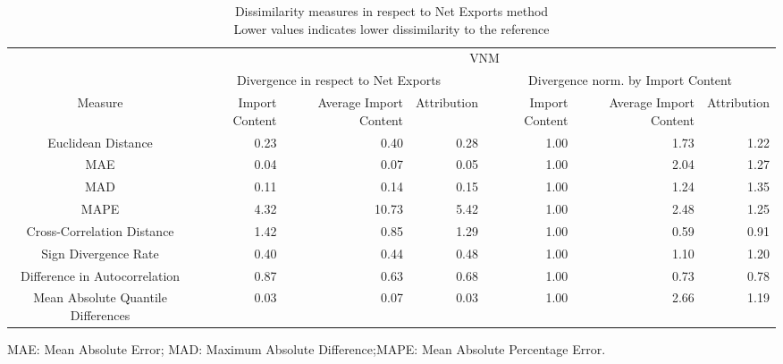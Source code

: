 \begin{table}[t]
\caption*{
{\large Dissimilarity measures in respect to Net Exports method} \\ 
{\small Lower values indicates lower dissimilarity to the reference}
} 
\fontsize{15.0pt}{18.0pt}\selectfont
\begin{tabular*}{\linewidth}{@{\extracolsep{\fill}}crrrrrr}
\toprule
 & \multicolumn{6}{c}{VNM} \\ 
\cmidrule(lr){2-7}
 & \multicolumn{3}{c}{Divergence in respect to Net Exports} & \multicolumn{3}{c}{Divergence norm. by Import Content} \\ 
\cmidrule(lr){2-4} \cmidrule(lr){5-7}
Measure & Import Content & Average Import Content & Attribution & Import Content & Average Import Content & Attribution \\ 
\midrule\addlinespace[2.5pt]
Euclidean Distance & 0.23 & 0.40 & 0.28 & 1.00 & 1.73 & 1.22 \\ 
MAE & 0.04 & 0.07 & 0.05 & 1.00 & 2.04 & 1.27 \\ 
MAD & 0.11 & 0.14 & 0.15 & 1.00 & 1.24 & 1.35 \\ 
MAPE & 4.32 & 10.73 & 5.42 & 1.00 & 2.48 & 1.25 \\ 
Cross-Correlation Distance & 1.42 & 0.85 & 1.29 & 1.00 & 0.59 & 0.91 \\ 
Sign Divergence Rate & 0.40 & 0.44 & 0.48 & 1.00 & 1.10 & 1.20 \\ 
Difference in Autocorrelation & 0.87 & 0.63 & 0.68 & 1.00 & 0.73 & 0.78 \\ 
Mean Absolute Quantile Differences & 0.03 & 0.07 & 0.03 & 1.00 & 2.66 & 1.19 \\ 
\bottomrule
\end{tabular*}
\begin{minipage}{\linewidth}
MAE: Mean Absolute Error; MAD: Maximum Absolute Difference;MAPE: Mean Absolute Percentage Error.\\
\end{minipage}
\end{table}

